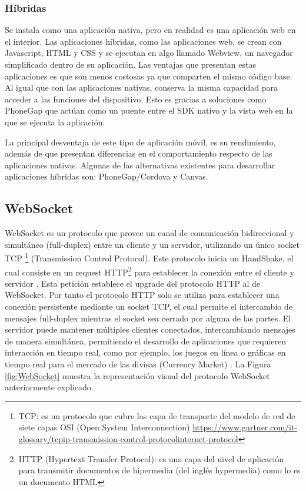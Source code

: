 	\subsubsection{Híbridas}
	Se instala como una aplicación nativa, pero en realidad es una aplicación web en el interior. Las aplicaciones híbridas, como las aplicaciones web, se crean con Javascript, HTML y CSS y se ejecutan en algo llamado Webview, un navegador simplificado dentro de su aplicación.
	Las ventajas que presentan estas aplicaciones es que son menos costosas ya que comparten el mismo código base. Al igual que con las aplicaciones nativas, conserva la misma capacidad para acceder a las funciones del dispositivo. Esto es gracias a soluciones como PhoneGap que actúan como un puente entre el SDK nativo y la vista web en la que se ejecuta la aplicación. 
	
	La principal desventaja de este tipo de aplicación móvil, es su rendimiento, además de que presentan diferencias en el comportamiento respecto de las aplicaciones nativas. Algunas de las alternativas existentes para desarrollar aplicaciones híbridas son: PhoneGap/Cordova y Canvas. \citep{mobile-apps-types}

\subsection{WebSocket}
WebSocket es un protocolo que provee un canal de comunicación bidireccional y simultáneo (full-duplex) entre un cliente y un servidor, utilizando un único socket TCP \footnote{TCP: es un protocolo que cubre las capa de transporte del modelo de red de siete capas OSI (Open System Interconnection) \url{https://www.gartner.com/it-glossary/tcpip-transmission-control-protocolinternet-protocol}} (Transmission Control Protocol). Este protocolo inicia un HandShake, el cual consiste en un request HTTP\footnote{HTTP (Hypertext Transfer Protocol): es una capa del nivel de aplicación para transmitir documentos de hipermedia (del inglés hypermedia) como lo es un documento HTML} para establecer la conexión entre el cliente y servidor \citep{websocket-html5} . Esta petición establece el upgrade del protocolo HTTP al de WebSocket. Por tanto el protocolo HTTP solo se utiliza para establecer una conexión persistente mediante un socket TCP, el cual permite el intercambio de mensajes full-duplex mientras el socket sea cerrado por alguna de las partes. El servidor puede mantener múltiples clientes conectados, intercambiando mensajes de manera simultánea, permitiendo el desarrollo de aplicaciones que requieren interacción en tiempo real, como por ejemplo, los juegos en línea o gráficas en tiempo real para el mercado de las divisas (Currency Market) \citep{websocket-scalability}. La Figura \ref{fig:WebSocket} muestra la representación visual del protocolo WebSocket anteriormente explicado.

